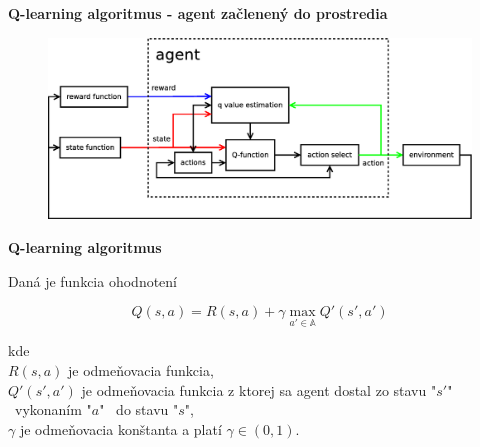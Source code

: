 \documentclass[xcolor=dvipsnames]{beamer}
\begin{document}
\begin{frame}{\bf Q-learning algoritmus - agent začlenený do prostredia}

\begin{figure}[!htb]
\includegraphics[scale=.3]{../diagrams/q_learning_agent.eps}
\end{figure}

\end{frame}




\begin{frame}{\bf Q-learning algoritmus}

Daná je funkcia ohodnotení

\begin{equation} \label{eu_eqn}
Q(s,a) = R(s,a) + \gamma \max_{a' \in \mathbb{A}} Q'(s', a')
\end{equation}

kde \\
$R(s,a)$ je odmeňovacia funkcia, \\
$Q'(s',a')$ je odmeňovacia funkcia z ktorej sa agent dostal zo stavu "$s'$" \ vykonaním "$a$" \ do
stavu "$s$", \\
$\gamma$ je odmeňovacia konštanta a platí $\gamma \in (0, 1)$.

\end{frame}
\end{document}
